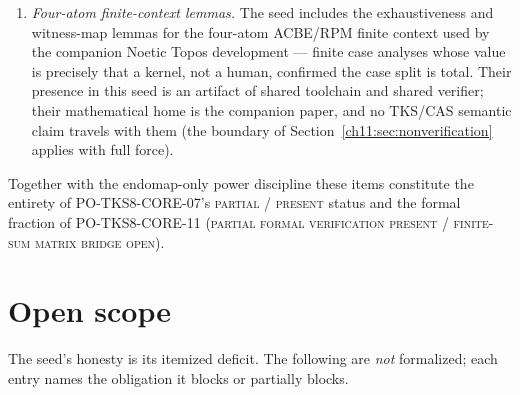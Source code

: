 \begin{enumerate}
      supports --- which target coordinates can be nonzero --- the seed
      checks that the support of a composite lift is the relational
      product of the component supports, tying the matrix picture to the
      underlying relation composition.
\item \emph{Four-atom finite-context lemmas.} The seed includes the
      exhaustiveness and witness-map lemmas for the four-atom ACBE/RPM
      finite context used by the companion Noetic Topos development ---
      finite case analyses whose value is precisely that a kernel, not a
      human, confirmed the case split is total. Their presence in this
      seed is an artifact of shared toolchain and shared verifier; their
      mathematical home is the companion paper, and no TKS/CAS semantic
      claim travels with them (the boundary of
      Section~\ref{ch11:sec:nonverification} applies with full force).
\end{enumerate}

Together with the endomap-only power discipline these items constitute
the entirety of PO-TKS8-CORE-07's \textsc{partial / present} status and
the formal fraction of PO-TKS8-CORE-11 (\textsc{partial formal
verification present / finite-sum matrix bridge open}).

\section{Open scope}\label{ch11:sec:open}

The seed's honesty is its itemized deficit. The following are
\emph{not} formalized; each entry names the obligation it blocks or
partially blocks.

